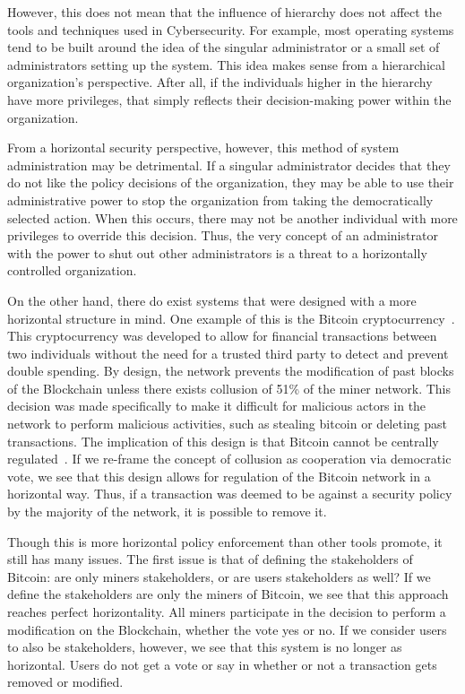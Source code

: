 However, this does not mean that the influence of hierarchy does not affect the
tools and techniques used in Cybersecurity. For example, most operating systems
tend to be built around the idea of the singular administrator or a small set of
administrators setting up the system. This idea makes sense from a  hierarchical
organization's perspective. After all, if the individuals higher in the
hierarchy have more privileges, that simply reflects their decision-making 
power within the organization. 

From a horizontal security perspective, however, this method of system 
administration may be detrimental. If a singular administrator decides that
they do not like the policy decisions of the organization, they may be able to
use their administrative power to stop the organization from taking the
democratically selected action. When this occurs, there may not be another
individual with more privileges to override this decision. Thus, the very
concept of an administrator with the power to shut out other administrators is a
threat to a horizontally controlled organization. 

On the other hand, there do exist systems that were designed with a more
horizontal structure in mind. One example of this is the Bitcoin 
cryptocurrency~\cite{nakamoto2019bitcoin}. This cryptocurrency was developed to
allow for financial transactions between two individuals without the need for a
trusted third party to detect and prevent double spending. By design, the
network prevents the modification of past blocks of the Blockchain unless there
exists collusion of 51\% of the miner network. This decision was made
specifically to make it difficult for malicious actors in the network to perform
malicious activities, such as stealing bitcoin or deleting past transactions.
The implication of this design is that Bitcoin cannot be centrally 
regulated~\cite{tu2015rethinking}. If we re-frame the concept of collusion as 
cooperation via democratic vote, we see that this design allows for regulation
of the Bitcoin network in a horizontal way. Thus, if a transaction was deemed
to be against a security policy by the majority of the network, it is possible
to remove it.

Though this is more horizontal policy enforcement than other tools promote, it
still has many issues. The first issue is that of defining the stakeholders of
Bitcoin: are only miners stakeholders, or are users stakeholders as well? If we
define the stakeholders are only the miners of Bitcoin, we see that this
approach reaches perfect horizontality. All miners participate in the decision
to perform a modification on the Blockchain, whether the vote yes or no. If we
consider users to also be stakeholders, however, we see that this system is no
longer as horizontal. Users do not get a vote or say in whether or not a
transaction gets removed or modified. 

